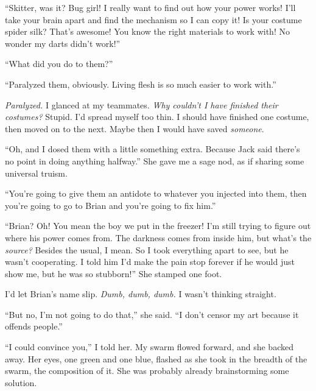 ``Skitter, was it?  Bug girl!  I really want to find out how your power works!  I'll take your brain apart and find the mechanism so I can copy it!  Is your costume spider silk?  That's awesome!  You know the right materials to work with!  No wonder my darts didn't work!''



``What did you do to them?''



``Paralyzed them, obviously.  Living flesh is so much easier to work with.''



\emph{Paralyzed.  }I glanced at my teammates.  \emph{Why couldn't I have finished their costumes?  }Stupid.  I'd spread myself too thin.  I should have finished one costume, then moved on to the next.  Maybe then I would have saved \emph{someone}.



``Oh, and I dosed them with a little something extra.  Because Jack said there's no point in doing anything halfway.''  She gave me a sage nod, as if sharing some universal truism.



``You're going to give them an antidote to whatever you injected into them, then you're going to go to Brian and you're going to fix him.''



``Brian?  Oh!  You mean the boy we put in the freezer!  I'm still trying to figure out where his power comes from.  The darkness comes from inside him, but what's the \emph{source?}  Besides the usual, I mean.  So I took everything apart to see, but he wasn't cooperating.  I told him I'd make the pain stop forever if he would just show me, but he was so stubborn!''  She stamped one foot.



I'd let Brian's name slip.  \emph{Dumb, dumb, dumb.}  I wasn't thinking straight.



``But no, I'm not going to do that,'' she said.  ``I don't censor my art because it offends people.''



``I could convince you,'' I told her.  My swarm flowed forward, and she backed away.  Her eyes, one green and one blue, flashed as she took in the breadth of the swarm, the composition of it.  She was probably already brainstorming some solution.



